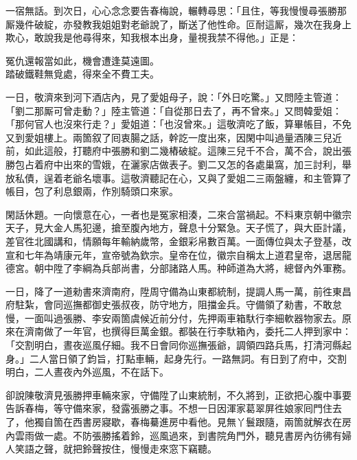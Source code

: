一宿無話。到次日，心心念念要告春梅說，輾轉尋思：「且住，等我慢慢尋張勝那厮幾件破綻，亦發教我姐姐對老爺說了，斷送了他性命。{}叵耐這厮，幾次在我身上欺心，敢說我是他尋得來，知我根本出身，量視我禁不得他。」正是：

\begin{myquote}
冤仇還報當如此，機會遭逢莫遠圖。\\踏破鐵鞋無覓處，得來全不費工夫。
\end{myquote}

一日，敬濟來到河下酒店內，見了愛姐母子，說：「外日吃驚。」又問陸主管道：「劉二那厮可曾走動？」陸主管道：「自從那日去了，再不曾來。」又問韓愛姐：「那何官人也沒來行走？」愛姐道：「也沒曾來。」這敬濟吃了飯，算畢帳目，不免又到愛姐樓上。兩箇叙了囘衷腸之話，幹訖一度出來，因閑中叫過量酒陳三兒近前，如此這般，打聽府中張勝和劉二幾樁破綻。這陳三兒千不合，萬不合，說出張勝包占着府中出來的雪娥，在灑家店做表子。劉二又怎的各處巢窩，加三討利，舉放私債，逞着老爺名壞事。{}這敬濟聽記在心，又與了愛姐二三兩盤纏，和主管算了帳目，包了利息銀兩，作別騎頭口來家。

閑話休題。一向懷意在心，一者也是冤家相湊，二來合當禍起。不料東京朝中徽宗天子，見大金人馬犯邊，搶至腹內地方，聲息十分緊急。天子慌了，與大臣計議，差官徃北國講和，情願每年輸納歲幣，金銀彩帛數百萬。一面傳位與太子登基，改宣和七年為靖康元年，宣帝號為欽宗。皇帝在位，徽宗自稱太上道君皇帝，退居龍德宮。朝中陞了李綱為兵部尚書，分部諸路人馬。种師道為大將，總督內外軍務。

一日，降了一道勑書來濟南府，陞周守備為山東都統制，提調人馬一萬，前徃東昌府駐紮，會同巡撫都御史張叔夜，防守地方，阻擋金兵。守備領了勑書，不敢怠慢，一面叫過張勝、李安兩箇虞候近前分付，先押兩車箱馱行李細軟器物家去。原來在濟南做了一年官，也撰得巨萬金銀。都裝在行李馱箱內，委托二人押到家中：「交割明白，晝夜巡風仔細。我不日會同你巡撫張爺，調領四路兵馬，打清河縣起身。」二人當日領了鈞旨，打點車輛，起身先行。一路無詞。有日到了府中，交割明白，二人晝夜內外巡風，不在話下。

卻說陳敬濟見張勝押車輛來家，守備陞了山東統制，不久將到，正欲把心腹中事要告訴春梅，等守備來家，發露張勝之事。不想一日因渾家葛翠屏徃娘家囘門住去了，他獨自箇在西書房寢歇，春梅驀進房中看他。見無丫鬟跟隨，兩箇就解衣在房內雲雨做一處。不防張勝搖着鈴，巡風過來，{}到書院角門外，聽見書房內彷彿有婦人笑語之聲，就把鈴聲按住，慢慢走來窓下竊聽。

